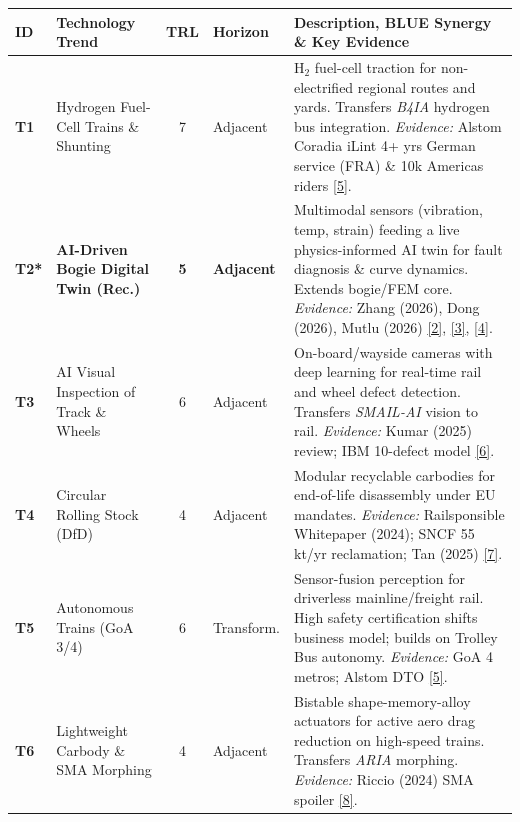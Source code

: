 \documentclass[11pt,a4paper]{article}
\begin{document}
\begin{table}[ht!]
\centering
\begin{tabularx}{\textwidth}{@{}l p{3.3cm} c l X@{}}
\toprule
\textbf{ID} & \textbf{Technology Trend} & \textbf{TRL} & \textbf{Horizon} & \textbf{Description, BLUE Synergy \& Key Evidence} \\
\midrule
\textbf{T1} & Hydrogen Fuel-Cell Trains \& Shunting & 7 & Adjacent & H$_2$ fuel-cell traction for non-electrified regional routes and yards. Transfers \textit{B4IA} hydrogen bus integration. \textit{Evidence:} Alstom Coradia iLint 4+ yrs German service (FRA) \& 10k Americas riders \href{https://www.alstom.com/solutions/rolling-stock/alstom-coradia-ilint-worlds-1st-hydrogen-powered-passenger-train}{[5]}. \\
\textbf{T2*} & \textbf{AI-Driven Bogie Digital Twin (Rec.)} & \textbf{5} & \textbf{Adjacent} & Multimodal sensors (vibration, temp, strain) feeding a live physics-informed AI twin for fault diagnosis \& curve dynamics. Extends bogie/FEM core. \textit{Evidence:} Zhang (2026), Dong (2026), Mutlu (2026) \href{https://journals.sagepub.com/doi/abs/10.1177/14759217261483593}{[2]}, \href{https://link.springer.com/article/10.1007/s12206-026-0906-5}{[3]}, \href{https://www.mdpi.com/2412-3811/11/3/87}{[4]}. \\
\textbf{T3} & AI Visual Inspection of Track \& Wheels & 6 & Adjacent & On-board/wayside cameras with deep learning for real-time rail and wheel defect detection. Transfers \textit{SMAIL-AI} vision to rail. \textit{Evidence:} Kumar (2025) review; IBM 10-defect model \href{https://www.sciencedirect.com/science/article/pii/S2046043024000716}{[6]}. \\
\textbf{T4} & Circular Rolling Stock (DfD) & 4 & Adjacent & Modular recyclable carbodies for end-of-life disassembly under EU mandates. \textit{Evidence:} Railsponsible Whitepaper (2024); SNCF 55 kt/yr reclamation; Tan (2025) \href{https://railsponsible.group/app/uploads/2024/09/20240910_Whitepaper-circularity_FINAL.pdf}{[7]}. \\
\textbf{T5} & Autonomous Trains (GoA 3/4) & 6 & Transform. & Sensor-fusion perception for driverless mainline/freight rail. High safety certification shifts business model; builds on Trolley Bus autonomy. \textit{Evidence:} GoA 4 metros; Alstom DTO \href{https://www.alstom.com/autonomous-mobility-future-rail-automated}{[5]}. \\
\textbf{T6} & Lightweight Carbody \& SMA Morphing & 4 & Adjacent & Bistable shape-memory-alloy actuators for active aero drag reduction on high-speed trains. Transfers \textit{ARIA} morphing. \textit{Evidence:} Riccio (2024) SMA spoiler \href{https://www.mdpi.com/2076-0825/13/9/330}{[8]}. \\
\bottomrule
\end{tabularx}
\label{tab:radar}
\end{table}
\end{document}
